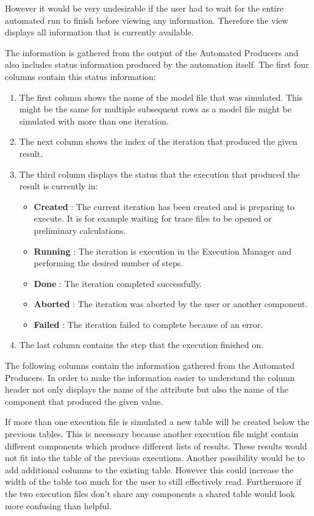 However it would be very undesirable if the user had to wait for the entire automated run
to finish before viewing any information. Therefore the view displays all information
that is currently available. 

The information is gathered from the output of the Automated Producers and also
includes status information produced by the automation itself. The first four
columns contain this status information:
\begin{enumerate}
 \item The first column shows the name of the model file that was simulated. This
might be the same for multiple subsequent rows as a model file might be simulated
with more than one iteration.
 \item The next column shows the index of the iteration that produced the given result.
 \item The third column displays the status that the execution that produced the result
is currently in:
\begin{itemize}
 \item \textbf{Created} : The current iteration has been created and is preparing to execute.
It is for example waiting for trace files to be opened or preliminary calculations.
 \item \textbf{Running} : The iteration is execution in the Execution Manager and performing
the desired number of steps.
 \item \textbf{Done} : The iteration completed successfully.
 \item \textbf{Aborted} : The iteration was aborted by the user or another component.
 \item \textbf{Failed} : The iteration failed to complete because of an error.
\end{itemize}
 \item The last column contains the step that the execution finished on.
\end{enumerate}
The following columns contain the information gathered from the Automated Producers.
In order to make the information easier to understand the column header not only displays
the name of the attribute but also the name of the component that produced the given
value.

If more than one execution file is simulated a new table will be created below the previous
tables. This is necessary because another execution file might contain different
components which produce different lists of results. These results would not fit into
the table of the previous executions. Another possibility would be to add additional columns
to the existing table. However this could increase the width of the table too much for the
user to still effectively read. Furthermore if the two execution files don't share any
components a shared table would look more confusing than helpful.

